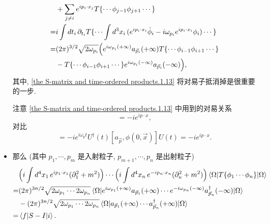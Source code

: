 \begin{itemize}
\begin{align}
		& + \sum_{j \neq i} e^{i p_i \cdot x_j} T\{\cdots \phi_{j - 1} \phi_{j + 1} \cdots\} \label{the S-matrix and time-ordered products.1.13} \\
		=& i \int dt_i \, \partial_{t_i} T\{\cdots \int d^3 x_i \, (e^{i p_i \cdot x_i} \dot{\phi}_i - i \omega_{p_i} e^{i p_i \cdot x_i} \phi_i) \cdots\} \notag \\
		=& (2 \pi)^{3 / 2} \sqrt{2 \omega_{p_i}} \Big( e^{i \omega_{p_i} (+ \infty)} a_{\vec{p}_i}(+ \infty) T\{\cdots \phi_{i - 1} \phi_{i + 1} \cdots\} \notag \\
		& - T\{\cdots \phi_{i - 1} \phi_{i + 1} \cdots\} e^{i \omega_{p_i} (- \infty)} a_{\vec{p}_i}(- \infty) \Big),
	\end{align}
	其中, \eqref{the S-matrix and time-ordered products.1.13} 将对易子抵消掉是很重要的一步.
	
	\begin{tcolorbox}[title=remark:]
		注意 \eqref{the S-matrix and time-ordered products.1.13} 中用到的对易关系
		\begin{equation}
			[\underbrace{\int d^3 y \, e^{i (\omega_p t - \vec{p} \cdot \vec{y})} (\dot{\phi}(t, \vec{y}) - i \omega_p \phi(t, \vec{y}))}_{\overset{t \rightarrow \pm \infty}{=} - i (2 \pi)^{3 / 2} \sqrt{2 \omega_p} e^{i \omega_p t} a_{\vec{p}}(t)}, \phi(t, \vec{x})] = - i e^{i p \cdot x},
		\end{equation}
		对比
		\begin{equation}
			[- i (2 \pi)^{3 / 2} \sqrt{2 \omega_p} e^{i \omega_p t} a_{\vec{p}}(t), \phi(x)] = - i e^{i \omega_p t} U^\dag(t) [a_{\vec{p}}, \phi(0, \vec{x})] U(t) = - i e^{i p \cdot x}.
		\end{equation}
	\end{tcolorbox}
	
	\item 那么 (其中 $p_1, \cdots, p_m$ 是入射粒子, $p_{m + 1}, \cdots, p_n$ 是出射粒子)
	\begin{align}
		& \Big( i \int d^4 x_1 \, e^{i p_1 \cdot x_1} (\partial_1^2 + m^2) \Big) \cdots \Big( i \int d^4 x_n \, e^{- i p_n \cdot x_n} (\partial_n^2 + m^2) \Big) \braket{\Omega | T\{\phi_1 \cdots \phi_n\} | \Omega} \notag \\
		=& (2 \pi)^{3 n / 2} \sqrt{2 \omega_{p_1} \cdots 2 \omega_{p_n}} \braket{\Omega | e^{i \omega_{p_1} (+ \infty)} a_{\vec{p}_1}(+ \infty) \cdots e^{- i \omega_{p_n} (- \infty)} a^\dag_{\vec{p}_n}(- \infty) | \Omega} \notag \\
		& - (2 \pi)^{3 n / 2} \sqrt{2 \omega_{p_1} \cdots 2 \omega_{p_n}} \braket{\Omega | a_{\vec{p}_1}(+ \infty) \cdots a^\dag_{\vec{p}_n}(+ \infty) | \Omega} \notag \\
		=& \braket{f | S - I | i}.
	\end{align}
\end{itemize}


